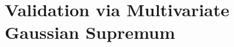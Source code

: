 \documentclass[mnsc,blindrev]{informs4} %
\newcommand{\R}{\mathbb{R}}
\begin{document}


\section{Validation via Multivariate Gaussian Supremum}\label{sec:gaussian supremum margin}

\end{document}
